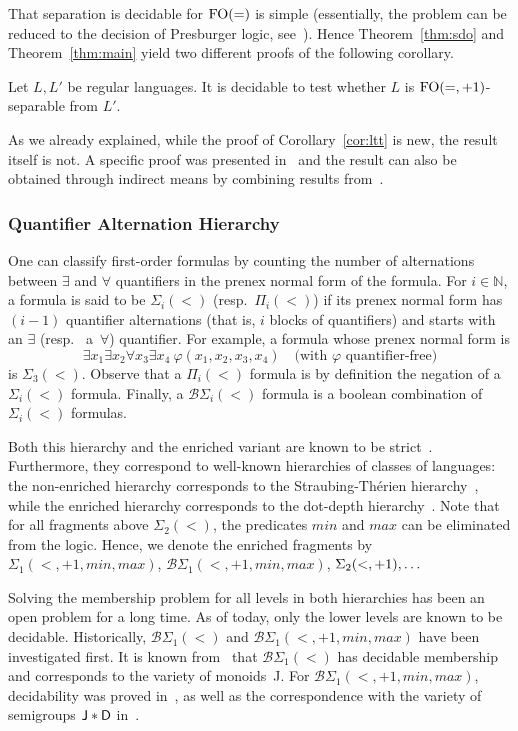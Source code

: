 \documentclass[a4paper,USenglish]{lipics}
\newcommand\nat{\ensuremath{\mathbb{N}}\xspace}
\newcommand\Dbf{\ensuremath{{\sf D}}\xspace}
\newcommand{\plus}{\ensuremath{+1,min,max}}
\newcommand{\sio}[1]{\ensuremath{\Sigma_{#1}(<)}\xspace}
\newcommand{\sip}[1]{\ensuremath{\Sigma_{#1}(<,\plus)}\xspace}
\newcommand{\pio}[1]{\ensuremath{\Pi_{#1}(<)}\xspace}
\newcommand{\bso}[1]{\ensuremath{\mathcal{B}\Sigma_{#1}(<)}\xspace}
\newcommand{\bsp}[1]{\ensuremath{\mathcal{B}\Sigma_{#1}(<,\plus)}\xspace}
\newcommand{\sdp}{\ensuremath{\Sigma_{2}(<,+1)}\xspace}
\newcommand{\sdo}{\sio{2}}
\newcommand{\foeq}{\ensuremath{\textup{FO}(=)}\xspace}
\newcommand{\foeqp}{\ensuremath{\textup{FO}(=,+1)}\xspace}
\theoremstyle{plain}
\begin{document}
That separation is decidable for \foeq is simple (essentially, the
problem can be reduced to the decision of Presburger logic,
see~\cite{ltltt:2013}). Hence Theorem~\ref{thm:sdo} and
Theorem~\ref{thm:main} yield two different proofs of the following
corollary.

\begin{corollary} \label{cor:ltt}
  Let $L,L'$ be regular languages. It is decidable to test whether $L$
  is \foeqp-separable from $L'$.
\end{corollary}

As we already explained, while the proof of Corollary~\ref{cor:ltt} is new,
the result itself is not. A specific proof was presented in~\cite{ltltt:2013}
and the result can also be obtained through indirect means by combining
results from~\cite{MR1709911,Steinberg:delay-pointlikes:2001}.

\subsubsection{Quantifier Alternation Hierarchy}
\label{sec:quant-altern-hier}
One can classify first-order formulas by counting the number of alternations
between $\exists$ and $\forall$ quantifiers in the prenex normal form of the
formula. For $i \in \nat$, a formula is said to be \sio{i} (resp.\ \pio{i}) if
its prenex normal form has $(i -1)$ quantifier alternations (that is, $i$
blocks of quantifiers) and starts with an $\exists$ (resp.~ a\ $\forall$)
quantifier. For example, a formula whose prenex normal form is
\[
\exists x_1 \exists x_2  \forall x_3 \exists x_4
\ \varphi(x_1,x_2,x_3,x_4) \quad \text{(with $\varphi$ quantifier-free)}
\]
\noindent
is {\sio 3}. Observe that a \pio{i} formula is by definition the
negation of a \sio{i} formula. Finally, a \bso{i} formula is a boolean
combination of \sio{i} formulas.

Both this hierarchy and the enriched variant are known to be
strict~\cite{BroKnaStrict,ThomStrict}. Furthermore, they correspond to
well-known hierarchies of classes of languages: the non-enriched hierarchy
corresponds to the Straubing-Thérien hierarchy~\cite{StrauConcat,TheConcat},
while the enriched hierarchy corresponds to the dot-depth
hierarchy~\cite{BrzoDot}. Note that for all fragments above \sdo, the
predicates $min$ and $max$ can be eliminated from the logic. Hence, we denote
the enriched fragments by {\sip 1}, \mbox{{\bsp 1}}, $\mbox{\sdp},\dots$

Solving the membership problem for all levels in both hierarchies has been an
open problem for a long time. As of today, only the lower levels are known to
be decidable. Historically, {\bso 1} and {\bsp 1} have been investigated
first. It is known from~\cite{simon75} that {\bso 1} has decidable membership
and corresponds to the variety of monoids~{\sf J}. For {\bsp 1}, decidability
was proved in~\cite{Knast:dd1:1983a}, as well as the correspondence with the
variety of semigroups ${\sf J} * \Dbf$ in~\cite{Str85}.
\end{document}
